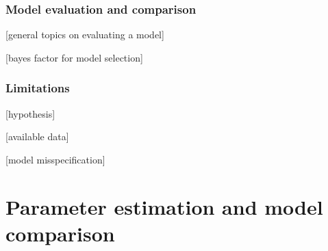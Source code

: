 \documentclass[12pt,a4paper]{report}
\begin{document}
\subsection{Model evaluation and comparison}

[general topics on evaluating a model]

[bayes factor for model selection]

\subsection{Limitations}

[hypothesis]

[available data]

[model misspecification]


















\chapter{Parameter estimation and model comparison}
\end{document}
